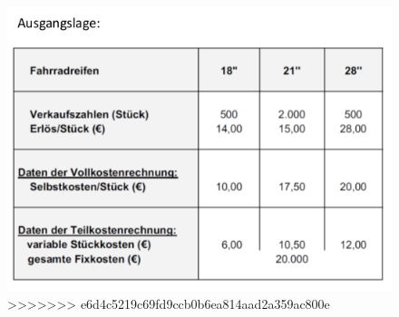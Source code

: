 \documentclass[a4paper,11pt, twoside]{article}
\begin{document}
\begin{figure}[h]
 \begin{center}
   \includegraphics[scale=0.5]{bilder/beispiel_vollteilkostenrechnung1.png}
>>>>>>> e6d4c5219c69fd9ccb0b6ea814aad2a359ac800e
 \end{center}
\end{figure}
\end{document}
